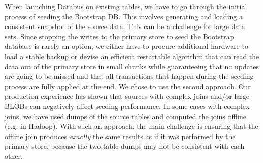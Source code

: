 When launching Databus on existing tables, we have to go through the initial process of seeding the Bootstrap DB. This involves generating and loading a consistent snapshot of the source data. This can be a challenge for large data sets. Since stopping the writes to the primary store to seed the Bootstrap database is rarely an option, we either have to procure additional hardware to load a stable backup or devise an efficient restartable algorithm that can read the data out of the primary store in small chunks while guaranteeing that no updates are going to be missed and that all transactions that happen during the seeding process are fully applied at the end. We chose to use the second approach. Our production experience has shown that sources with complex joins and/or large BLOBs can negatively affect seeding performance. In some cases with complex joins, we have used dumps of the source tables and computed the joins offline (e.g. in Hadoop). With such an approach, the main challenge is ensuring that the offline join produces \emph{exactly} the same results as if it was performed by the primary store, because the two table dumps may not be consistent with each other.


